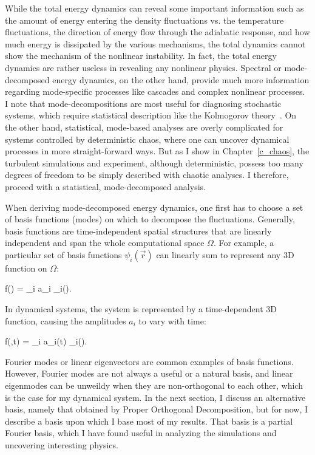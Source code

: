 While the total energy dynamics can reveal some important information such as the amount of energy entering the density fluctuations vs. the temperature fluctuations, the direction of
energy flow through the adiabatic response, and how much energy is dissipated by the various mechanisms, the total dynamics cannot show the mechanism of the nonlinear instability.
In fact, the total energy dynamics are rather useless in revealing any nonlinear physics. Spectral or mode-decomposed energy dynamics, on the other hand, provide much more information
regarding mode-specific processes like cascades and complex nonlinear processes. I note that mode-decompositions are most useful for diagnosing stochastic systems, 
which require statistical description like the Kolmogorov theory~\cite{Kolmogorov1941}. 
On the other hand, statistical, mode-based analyses are overly complicated for systems controlled by deterministic chaos, where one can uncover dynamical processes in more straight-forward ways. 
But as I show in Chapter~\ref{c_chaos}, the turbulent simulations and experiment, although deterministic, possess too many degrees of freedom to be simply described with chaotic analyses. 
I therefore, proceed with a statistical, mode-decomposed analysis.

When deriving mode-decomposed energy dynamics, one first has to choose a set of basis functions (modes) on which to decompose the fluctuations. 
Generally, basis functions are time-independent spatial structures that are linearly
independent and span the whole computational space $\Omega$. For example, a particular set of basis functions $\psi_i(\vec{r})$ can linearly sum to represent any 3D function on $\Omega$:

\beq
\label{func_decomp}
f() = \sum_i a_i \psi_i().
\eeq

In dynamical systems, the system is represented by a time-dependent 3D function, causing the amplitudes $a_i$ to vary with time:

\beq
\label{func_decomp_time}
f(,t) = \sum_i a_i(t) \psi_i().
\eeq

Fourier modes or linear eigenvectors are common examples of basis functions. However, Fourier modes are not always a useful or a natural basis, 
and linear eigenmodes can be unweildy when they are non-orthogonal to each other, which is the case for my dynamical system. In the next section, I discuss an alternative basis, 
namely that obtained by Proper Orthogonal Decomposition, but for now, I describe a basis upon which I base most of my results. That basis is a partial Fourier basis, which I have found useful 
in analyzing the simulations and uncovering interesting physics.

